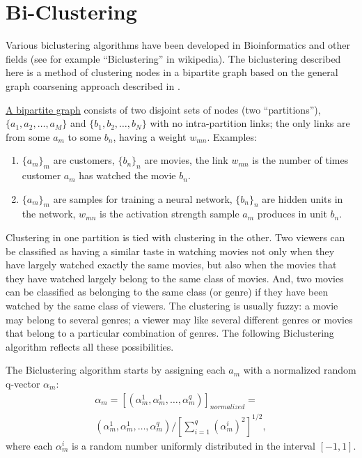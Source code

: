 \documentclass{article} %
\begin{document}

\section{Bi-Clustering}
\label{sec:bi-clustering}
Various biclustering algorithms have been developed in Bioinformatics and other fields (see for example ``Biclustering'' in wikipedia). The biclustering described here is a method of clustering nodes in a bipartite graph based on the general graph coarsening approach described in \cite{RSB}. 

\underline{A bipartite graph} consists of two disjoint sets of nodes (two ``partitions''), $\{a_1,a_2,\ldots,a_M\}$ and 
$\{b_1,b_2,\ldots,b_N\}$ with no intra-partition links; the only links are from some $a_m$ to some $b_n$, having a weight $w_{mn}$. Examples:
\begin{enumerate}
\item
$\{a_m\}_m$ are customers, $\{b_n\}_n$ are movies, the link $w_{mn}$ is the number of times customer $a_m$ has watched the movie $b_n$.
\item 
$\{a_m\}_m$ are samples for training a neural network, $\{b_n\}_n$ are  hidden units in the network, $w_{mn}$ is the activation strength sample $a_m$ produces in unit $b_n$.
\end{enumerate}

Clustering in one partition is tied with clustering in the other. Two viewers can be classified as having a similar taste in watching movies not only when they have largely watched exactly the same movies, but also when the movies that they have watched largely belong to the same class of movies. And, two movies can be classified as belonging to the same class (or genre) if they have been watched by the same class of viewers. The clustering is usually fuzzy: a movie may belong to several genres; a viewer may like several different genres or movies that belong to a particular combination of genres. The following Biclustering algorithm reflects all these possibilities. 

The Biclustering algorithm starts by assigning each $a_m$ with a normalized random q-vector $\alpha_m$:
\begin{equation}
\begin{split}
\alpha_m = \left[ (\alpha_m^1,\alpha_m^1,\ldots,\alpha_m^q) \right]_{normalized} =  \\
(\alpha_m^1,\alpha_m^1,\ldots,\alpha_m^q) /
\left[ \sum_{i=1}^q (\alpha_m^i)^2 \right]^{1/2},
\end{split}
\end{equation}
where each $\alpha_m^i$ is a random number uniformly distributed in the interval $[-1,1]$. 
\end{document}

